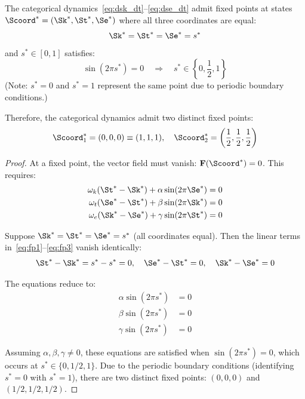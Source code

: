 \begin{theorem}
\label{thm:fixed_points}
The categorical dynamics~\eqref{eq:dsk_dt}--\eqref{eq:dse_dt} admit fixed points at states $\Scoord^* = (\Sk^*, \St^*, \Se^*)$ where all three coordinates are equal:
\begin{equation}
\Sk^* = \St^* = \Se^* = s^*
\label{eq:fixed_point_condition}
\end{equation}
and $s^* \in [0,1]$ satisfies:
\begin{equation}
\sin(2\pi s^*) = 0 \quad \Rightarrow \quad s^* \in \left\{0, \frac{1}{2}, 1\right\}
\label{eq:fixed_point_values}
\end{equation}
(Note: $s^* = 0$ and $s^* = 1$ represent the same point due to periodic boundary conditions.)

Therefore, the categorical dynamics admit two distinct fixed points:
\begin{equation}
\Scoord_1^* = (0, 0, 0) \equiv (1, 1, 1), \quad \Scoord_2^* = \left(\frac{1}{2}, \frac{1}{2}, \frac{1}{2}\right)
\label{eq:fixed_points}
\end{equation}
\end{theorem}

\begin{proof}
At a fixed point, the vector field must vanish: $\mathbf{F}(\Scoord^*) = 0$. This requires:
\begin{align}
\omega_k (\St^* - \Sk^*) + \alpha \sin(2\pi \Se^*) &= 0 \label{eq:fp1} \\
\omega_t (\Se^* - \St^*) + \beta \sin(2\pi \Sk^*) &= 0 \label{eq:fp2} \\
\omega_e (\Sk^* - \Se^*) + \gamma \sin(2\pi \St^*) &= 0 \label{eq:fp3}
\end{align}

Suppose $\Sk^* = \St^* = \Se^* = s^*$ (all coordinates equal). Then the linear terms in~\eqref{eq:fp1}--\eqref{eq:fp3} vanish identically:
\begin{equation}
\St^* - \Sk^* = s^* - s^* = 0, \quad \Se^* - \St^* = 0, \quad \Sk^* - \Se^* = 0
\end{equation}

The equations reduce to:
\begin{align}
\alpha \sin(2\pi s^*) &= 0 \\
\beta \sin(2\pi s^*) &= 0 \\
\gamma \sin(2\pi s^*) &= 0
\end{align}

Assuming $\alpha, \beta, \gamma \neq 0$, these equations are satisfied when $\sin(2\pi s^*) = 0$, which occurs at $s^* \in \{0, 1/2, 1\}$. Due to the periodic boundary conditions (identifying $s^* = 0$ with $s^* = 1$), there are two distinct fixed points: $(0,0,0)$ and $(1/2, 1/2, 1/2)$.
\end{proof}

